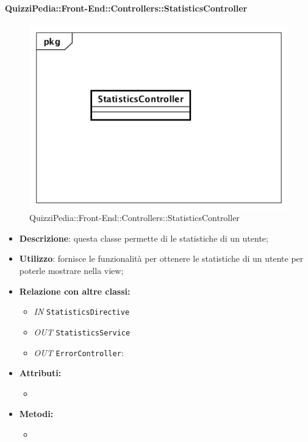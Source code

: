 \paragraph{QuizziPedia::Front-End::Controllers::StatisticsController}
\begin{figure}
	\centering
	\includegraphics[scale=0.45]{UML/Classi/Front-End/QuizziPedia_Front-end_Controller_StatisticsController.png}
	\caption{QuizziPedia::Front-End::Controllers::StatisticsController}
\end{figure}
\begin{itemize}
	\item \textbf{Descrizione}: questa classe permette di le statistiche di un utente;
	\item \textbf{Utilizzo}: fornisce le funzionalità per ottenere le statistiche di un utente per poterle mostrare nella view;
	\item \textbf{Relazione con altre classi:}
	\begin{itemize}
		\item \textit{IN} \texttt{StatisticsDirective} 
		\item \textit{OUT} \texttt{StatisticsService} 
		\item \textit{OUT} \texttt{ErrorController}: 
	\end{itemize}
	\item \textbf{Attributi:}
	\begin{itemize}
		\item 
	\end{itemize}
	\item \textbf{Metodi:}
	\begin{itemize}
		\item 
	\end{itemize}
\end{itemize}

